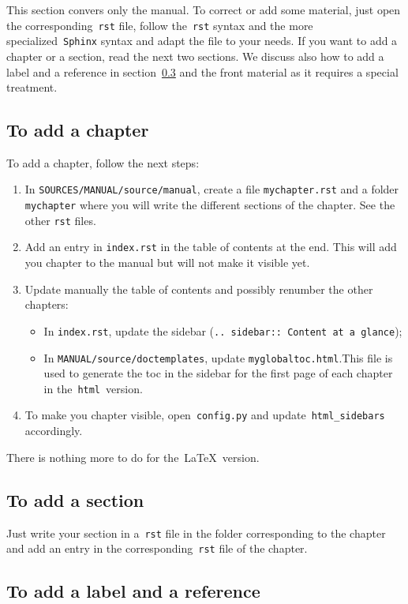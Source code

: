 \documentclass[a4paper,10pt]{article}
\newcommand{\code}[1]{\texttt{#1}}
\begin{document}
This section convers only the manual. To correct or add some material, just open the corresponding~\code{rst} file, follow the~\code{rst} syntax and the more specialized~\code{Sphinx} syntax and adapt the file to your needs. If you want to add a chapter or a section, read the next two sections. We discuss also how to add a label and a reference in section~\ref{adding_ref} and the front material as it requires a special treatment.

\subsection{To add a chapter}
To add a chapter, follow the next steps:
\begin{enumerate}
 \item In \code{SOURCES/MANUAL/source/manual}, create a file \code{mychapter.rst} and a folder \code{mychapter} where you will write the different sections of the chapter. See the other \code{rst} files.
 \item Add an entry in \code{index.rst} in the table of contents at the end. This will add you chapter to the manual but will not make it visible yet.
 \item Update manually the table of contents and possibly renumber the other chapters:
       \begin{itemize}
        \item In \code{index.rst}, update the sidebar (\code{.. sidebar:: Content at a glance});
        \item In \code{MANUAL/source/doctemplates}, update \code{myglobaltoc.html}.This file is used to generate the toc in the sidebar for the first page of each chapter in the~\code{html}~version.
       \end{itemize}
 \item To make you chapter visible, open~\code{config.py} and update~\code{html\_sidebars} accordingly.
\end{enumerate}

There is nothing more to do for the~\LaTeX\ version.

\subsection{To add a section}

Just write your section in a~\code{rst} file in the folder corresponding to the chapter and add an entry in the corresponding~\code{rst} file of the chapter.

\subsection{To add a label and a reference}
\label{adding_ref}
\end{document}
